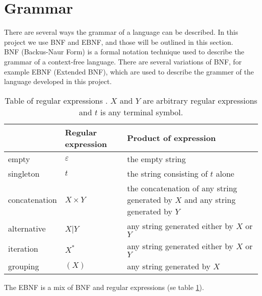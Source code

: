 \section{Grammar}
\label{sec:ebnf}

There are several ways the grammar of a language can be described. In this project we use BNF and EBNF, and those will be outlined in this section.\\
BNF (Backus-Naur Form) is a formal notation technique used to describe the grammar of a context-free language. There are several variations of BNF, for example EBNF (Extended BNF), which are used to describe the grammer of the language developed in this project.\\

\begin{center}
	\begin{table}[htb]
    \begin{tabular}{ | l | l | p{6.5cm} |}
    \hline
     & Regular expression & Product of expression\\ \hline
    empty & $\varepsilon$ & the empty string\\ \hline
    singleton & $t$ & the string consisting of $t$ alone\\ \hline
    concatenation & $X \times Y$ & the concatenation of any string generated	by $X$ and any string generated by $Y$\\ \hline
		alternative & $X$|$Y$ & any string generated either by $X$ or $Y$\\ \hline
		iteration & $X^*$ & any string generated either by $X$ or $Y$\\ \hline
		grouping & $(X)$ & any string generated by $X$\\ \hline
    \end{tabular}
		\caption{Table of regular expressions \cite{misc:spo}. $X$ and $Y$ are arbitrary regular expressions and $t$ is any terminal symbol.}
		\label{tab:re}
	\end{table}
\end{center}

The EBNF is a mix of BNF and regular expressions (se table \ref{tab:re}).